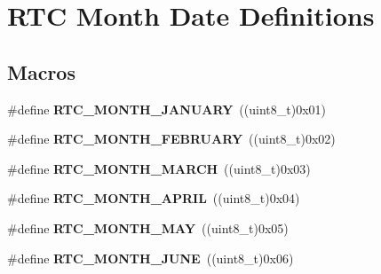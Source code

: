 \hypertarget{group___r_t_c___month___date___definitions}{}\section{R\+TC Month Date Definitions}
\label{group___r_t_c___month___date___definitions}
\subsection*{Macros}
\begin{DoxyCompactItemize}
\item 
\#define {\bfseries R\+T\+C\+\_\+\+M\+O\+N\+T\+H\+\_\+\+J\+A\+N\+U\+A\+RY}~((uint8\+\_\+t)0x01)\hypertarget{group___r_t_c___month___date___definitions_gabc94e7ef324c7d181c54302938138aab}{}\label{group___r_t_c___month___date___definitions_gabc94e7ef324c7d181c54302938138aab}

\item 
\#define {\bfseries R\+T\+C\+\_\+\+M\+O\+N\+T\+H\+\_\+\+F\+E\+B\+R\+U\+A\+RY}~((uint8\+\_\+t)0x02)\hypertarget{group___r_t_c___month___date___definitions_gadcec3575c8a670a948a3929a2e9f1b6b}{}\label{group___r_t_c___month___date___definitions_gadcec3575c8a670a948a3929a2e9f1b6b}

\item 
\#define {\bfseries R\+T\+C\+\_\+\+M\+O\+N\+T\+H\+\_\+\+M\+A\+R\+CH}~((uint8\+\_\+t)0x03)\hypertarget{group___r_t_c___month___date___definitions_gaa0ebba4b64b5591cd434b076c922a164}{}\label{group___r_t_c___month___date___definitions_gaa0ebba4b64b5591cd434b076c922a164}

\item 
\#define {\bfseries R\+T\+C\+\_\+\+M\+O\+N\+T\+H\+\_\+\+A\+P\+R\+IL}~((uint8\+\_\+t)0x04)\hypertarget{group___r_t_c___month___date___definitions_gac15a5a2164c0e536c579e7f16bd9f1b4}{}\label{group___r_t_c___month___date___definitions_gac15a5a2164c0e536c579e7f16bd9f1b4}

\item 
\#define {\bfseries R\+T\+C\+\_\+\+M\+O\+N\+T\+H\+\_\+\+M\+AY}~((uint8\+\_\+t)0x05)\hypertarget{group___r_t_c___month___date___definitions_ga44814b4fb8311b5842675769937129ec}{}\label{group___r_t_c___month___date___definitions_ga44814b4fb8311b5842675769937129ec}

\item 
\#define {\bfseries R\+T\+C\+\_\+\+M\+O\+N\+T\+H\+\_\+\+J\+U\+NE}~((uint8\+\_\+t)0x06)\hypertarget{group___r_t_c___month___date___definitions_gad3439b4b8c19720c01ef6c35d9bb99fa}{}\label{group___r_t_c___month___date___definitions_gad3439b4b8c19720c01ef6c35d9bb99fa}


\end{DoxyCompactItemize}
